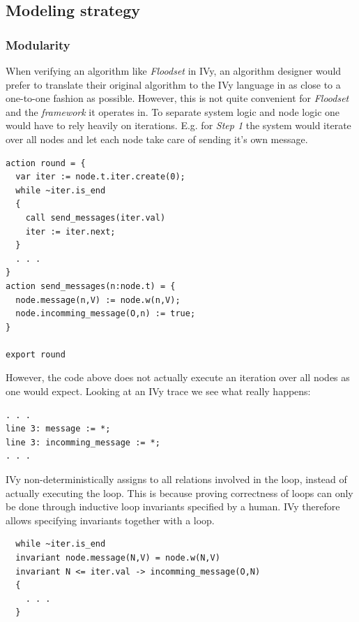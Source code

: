 \documentclass[fleqn]{article}
\begin{document}
\subsection{Modeling strategy}

\subsubsection{Modularity}
When verifying an algorithm like \textit{Floodset} in IVy, an algorithm designer would prefer to translate their original algorithm to the IVy language in as close to a one-to-one fashion as possible. However, this is not quite convenient for \textit{Floodset} and the \textit{framework} it operates in.
To separate system logic and node logic one would have to rely heavily on iterations. E.g. for \textit{Step 1} the system would iterate over all nodes and let each node take care of sending it's own message.

\begin{mdframed}[backgroundcolor=light-gray, roundcorner=10pt,leftmargin=1, rightmargin=1, innerleftmargin=15, innertopmargin=15,innerbottommargin=15, outerlinewidth=1, linecolor=light-gray]
\begin{lstlisting}
action round = {
  var iter := node.t.iter.create(0);
  while ~iter.is_end
  {
    call send_messages(iter.val)
    iter := iter.next;
  }
  . . .
}
action send_messages(n:node.t) = {
  node.message(n,V) := node.w(n,V);
  node.incomming_message(O,n) := true;
}

export round
\end{lstlisting}
\end{mdframed}

\noindent However, the code above does not actually execute an iteration over all nodes as one would expect. Looking at an IVy trace we see what really happens:

\begin{mdframed}[backgroundcolor=light-gray, roundcorner=10pt,leftmargin=1, rightmargin=1, innerleftmargin=15, innertopmargin=15,innerbottommargin=15, outerlinewidth=1, linecolor=light-gray]
\begin{lstlisting}
. . .
line 3: message := *;
line 3: incomming_message := *;
. . .
\end{lstlisting}
\end{mdframed}

IVy non-deterministically assigns to all relations involved in the loop, instead of actually executing the loop.  This is because proving correctness of loops can only be done through inductive loop invariants specified by a human. IVy therefore allows specifying invariants together with a loop.
\begin{mdframed}[backgroundcolor=light-gray, roundcorner=10pt,leftmargin=1, rightmargin=1, innerleftmargin=15, innertopmargin=15,innerbottommargin=15, outerlinewidth=1, linecolor=light-gray]
\begin{lstlisting}
  while ~iter.is_end
  invariant node.message(N,V) = node.w(N,V)
  invariant N <= iter.val -> incomming_message(O,N)
  {
    . . .
  }
\end{lstlisting}
\end{mdframed}
\end{document}
